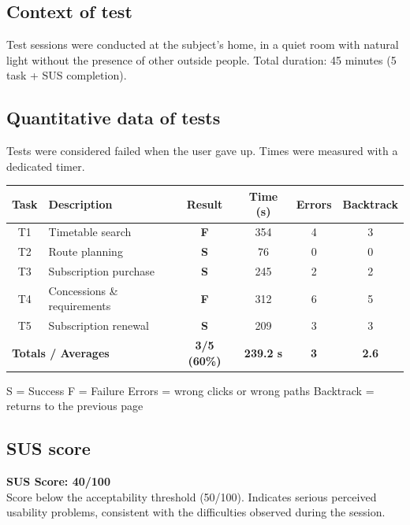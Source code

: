 ﻿\documentclass[11pt,a4paper]{article}
\begin{document}
\subsection*{Context of test}
\begin{tcolorbox}[base]
Test sessions were conducted at the subject's home, in a
quiet room with natural light without the presence of other outside people. Total duration: 45
minutes (5 task + SUS completion).
\end{tcolorbox}

\subsection*{Quantitative data of tests}
\begin{tcolorbox}[base]
Tests were considered failed when the user gave up.
Times were measured with a dedicated timer.
\begin{center}
\renewcommand{\arraystretch}{1.4}
\begin{tabular}{clcccc}
\toprule
\textbf{Task} & \textbf{Description} &
\textbf{Result} & \textbf{Time (s)} &
\textbf{Errors} & \textbf{Backtrack} \\
\midrule
T1 & Timetable search        & \textbf{F} & 354 & 4 & 3 \\
T2 & Route planning           & \textbf{S} & 76  & 0 & 0 \\
T3 & Subscription purchase    & \textbf{S} & 245 & 2 & 2 \\
T4 & Concessions \& requirements & \textbf{F} & 312 & 6 & 5 \\
T5 & Subscription renewal     & \textbf{S} & 209 & 3 & 3 \\
\midrule
\multicolumn{2}{l}{\textbf{Totals / Averages}} &
\textbf{3/5 (60\%)} & \textbf{239.2 s} &
\textbf{3} & \textbf{2.6} \\
\bottomrule
\end{tabular}
\end{center}

\vspace{0.3cm}
\small S = Success \quad F = Failure \quad
Errors = wrong clicks or wrong paths \quad
Backtrack = returns to the previous page
\end{tcolorbox}

\subsection*{SUS score}
\begin{tcolorbox}[base]
\textbf{SUS Score: 40/100}\\[0.2cm]
\small Score below the acceptability threshold
(50/100). Indicates serious perceived usability problems,
consistent with the difficulties observed during the session.
\end{tcolorbox}
\end{document}

